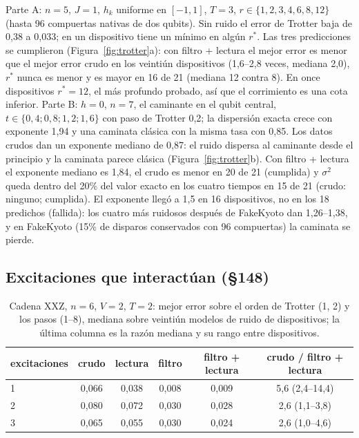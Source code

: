 \documentclass[11pt]{article}
\begin{document}
Parte A: $n=5$, $J=1$, $h_k$ uniforme en $[-1,1]$, $T=3$, $r\in\{1,2,3,4,6,8,12\}$ (hasta 96 compuertas
nativas de dos qubits). Sin ruido el error de Trotter baja de 0{,}38 a 0{,}033; en un dispositivo tiene un
mínimo en algún $r^*$. Las tres predicciones se cumplieron (Figura~\ref{fig:trotter}a): con filtro + lectura
el mejor error es menor que el mejor error crudo en los veintiún dispositivos (1{,}6--2{,}8 veces, mediana
2{,}0), $r^*$ nunca es menor y es mayor en 16 de 21 (mediana 12 contra 8). En once dispositivos $r^*=12$, el
más profundo probado, así que el corrimiento es una cota inferior. Parte B: $h=0$, $n=7$, el caminante en el
qubit central, $t\in\{0{,}4;0{,}8;1{,}2;1{,}6\}$ con paso de Trotter 0{,}2; la dispersión exacta crece con
exponente 1{,}94 y una caminata clásica con la misma tasa con 0{,}85. Los datos crudos dan un exponente
mediano de 0{,}87: el ruido dispersa al caminante desde el principio y la caminata parece clásica
(Figura~\ref{fig:trotter}b). Con filtro + lectura el exponente mediano es 1{,}84, el crudo es menor en 20 de 21
(cumplida) y $\sigma^2$ queda dentro del 20\% del valor exacto en los cuatro tiempos en 15 de 21 (crudo:
ninguno; cumplida). El exponente llegó a 1{,}5 en 16 dispositivos, no en los 18 predichos (fallida): los cuatro
más ruidosos después de FakeKyoto dan 1{,}26--1{,}38, y en FakeKyoto (15\% de disparos conservados con 96
compuertas) la caminata se pierde.

\subsection{Excitaciones que interactúan (§148)}

\begin{table}[h]
\centering\small
\begin{tabular}{lccccc}
\toprule
excitaciones & crudo & lectura & filtro & filtro + lectura & crudo / filtro + lectura\\
\midrule
1 & 0{,}066 & 0{,}038 & 0{,}008 & 0{,}009 & 5{,}6 (2{,}4--14{,}4)\\
2 & 0{,}080 & 0{,}072 & 0{,}030 & 0{,}028 & 2{,}6 (1{,}1--3{,}8)\\
3 & 0{,}065 & 0{,}055 & 0{,}030 & 0{,}024 & 2{,}6 (1{,}0--4{,}6)\\
\bottomrule
\end{tabular}
\caption{Cadena XXZ, $n=6$, $V=2$, $T=2$: mejor error sobre el orden de Trotter (1, 2) y los pasos (1--8),
mediana sobre veintiún modelos de ruido de dispositivos; la última columna es la razón mediana y su rango
entre dispositivos.}
\label{tab:xxz}
\end{table}
\end{document}
